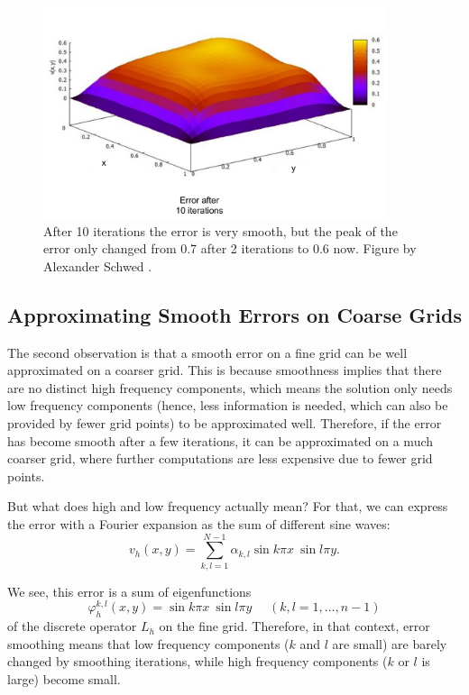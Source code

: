 \begin{figure}[tbp]
	\centering
	\includegraphics[width=0.9\textwidth]{chapters/chapter02/mg_error_smoothing_10}
	\caption{After 10 iterations the error is very smooth, but the peak of the error only changed from 0.7 after 2 iterations to 0.6 now. Figure by Alexander Schwed \cite{schwed}.}
	\label{fig:mg_error_smoothing_10}
\end{figure}


\subsection{Approximating Smooth Errors on Coarse Grids}
The second observation is that a smooth error on a fine grid can be well approximated on a coarser grid. This is because smoothness implies that there are no distinct high frequency components, which means the solution only needs low frequency components (hence, less information is needed, which can also be provided by fewer grid points) to be approximated well. Therefore, if the error has become smooth after a few iterations, it can be approximated on a much coarser grid, where further computations are less expensive due to fewer grid points.

But what does high and low frequency actually mean? For that, we can express the error with a Fourier expansion as the sum of different sine waves:
\begin{equation}
v_h(x,y) = \sum_{k,l = 1}^{N-1} \alpha_{k,l} \sin k \pi x~ \sin l \pi y.
\end{equation}

We see, this error is a sum of eigenfunctions 
\begin{equation}
\varphi_h ^{k,l}(x,y) = \sin k \pi x~ \sin l \pi y \text{~~~~}(k,l = 1, \hdots, n-1)
\end{equation}
of the discrete operator $L_h$ on the fine grid. Therefore, in that context, error smoothing means that low frequency components ($k$ and $l$ are small) are barely changed by smoothing iterations, while high frequency components ($k$ or $l$ is large) become small.

